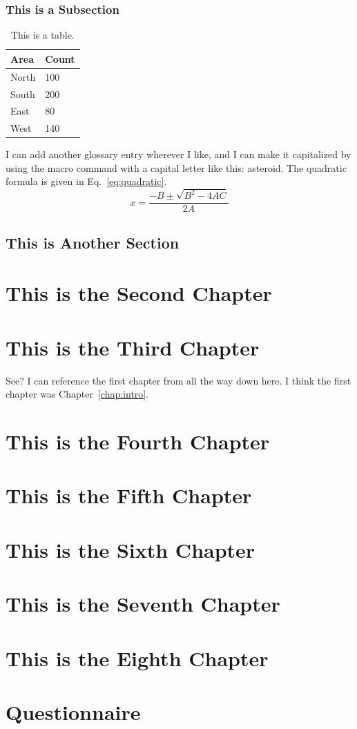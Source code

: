 \documentclass[12pt]{cwru_thesis}
\begin{document}
\subsection{This is a Subsection} \label{subsec:exsubsec}

\begin{table}[hbt!]
\centering
\begin{tabular}{ll}
\hline
Area & Count\\
\hline
North & 100\\
South & 200\\
East & 80\\
West & 140\\
\hline
\end{tabular}
\caption{This is a table. \label{tab:sample}}
\end{table}

\lipsum[3] 

I can add another glossary entry wherever I like, and I can make it capitalized by using the macro command with a capital letter like this: \Gls{asteroid}. The quadratic formula is given in Eq.~\eqref{eq:quadratic}.
\begin{equation}
    x=\frac{-B \pm \sqrt{B^2 - 4AC}}{2A}
    \label{eq:quadratic}
\end{equation}

\lipsum[4-5] 

\section{This is Another Section}
\lipsum[6-7] 

\chapter{This is the Second Chapter}
\lipsum[8-9]


\chapter{This is the Third Chapter}
See? I can reference the first chapter from all the way down here. I think the first chapter was Chapter~\ref{chap:intro}.
\chapter{This is the Fourth Chapter}
\chapter{This is the Fifth Chapter}
\chapter{This is the Sixth Chapter}
\chapter{This is the Seventh Chapter}
\chapter{This is the Eighth Chapter}


\appendix

\chapter{Questionnaire}

\printbibliography[heading=bibintoc]
\end{document}
